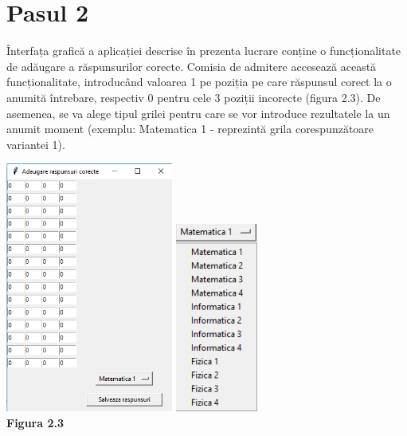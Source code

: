 \documentclass[a4paper,12pt]{report}
\newcommand\tab[1][1cm]{\hspace*{#1}}
\begin{document}
\section{Pasul 2}
\tab Înterfața grafică a aplicației descrise în prezenta lucrare conține o funcționalitate de adăugare a răspunsurilor corecte. Comisia de admitere accesează această funcționalitate, introducând valoarea 1 pe poziția pe care răspunsul corect 
la o anumită întrebare, respectiv 0 pentru cele 3 poziții incorecte (figura 2.3). De asemenea, se va alege tipul grilei pentru care se vor introduce rezultatele la un anumit moment (exemplu: Matematica 1 - reprezintă grila corespunzătoare variantei 1).
\begin {center} 
	\begin {footnotesize} 
		\includegraphics[width = 55mm]{fig2_3}
		\includegraphics[width = 27mm]{fig2_4} \\
		\textbf  {Figura 2.3} 
	\end {footnotesize} 
\end {center}
\end{document}
